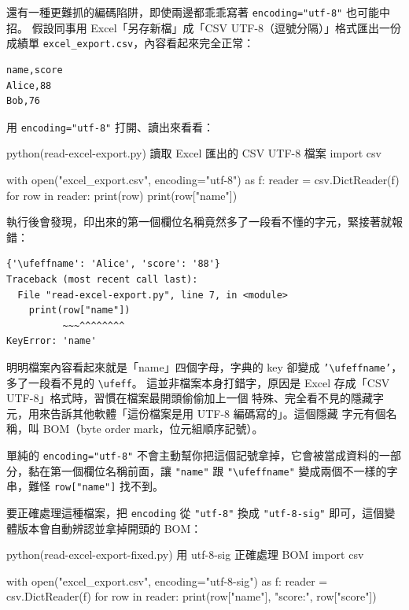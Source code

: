 還有一種更難抓的編碼陷阱，即使兩邊都乖乖寫著 \texttt{encoding="utf-8"} 也可能中招。
假設同事用 Excel「另存新檔」成「CSV UTF-8（逗號分隔）」格式匯出一份成績單
\texttt{excel\_export.csv}，內容看起來完全正常：

\begin{verbatim}
name,score
Alice,88
Bob,76
\end{verbatim}

用 \texttt{encoding="utf-8"} 打開、讀出來看看：

\begin{example}{python}{(read-excel-export.py) 讀取 Excel 匯出的 CSV UTF-8 檔案}
import csv

with open("excel_export.csv", encoding="utf-8") as f:
    reader = csv.DictReader(f)
    for row in reader:
        print(row)
        print(row["name"])
\end{example}

執行後會發現，印出來的第一個欄位名稱竟然多了一段看不懂的字元，緊接著就報錯：

\begin{verbatim}
{'\ufeffname': 'Alice', 'score': '88'}
Traceback (most recent call last):
  File "read-excel-export.py", line 7, in <module>
    print(row["name"])
          ~~~^^^^^^^^
KeyError: 'name'
\end{verbatim}

明明檔案內容看起來就是「name」四個字母，字典的 key 卻變成
\texttt{'\textbackslash ufeffname'}，多了一段看不見的 \texttt{\textbackslash ufeff}。
這並非檔案本身打錯字，原因是 Excel 存成「CSV UTF-8」格式時，習慣在檔案最開頭偷偷加上一個
特殊、完全看不見的隱藏字元，用來告訴其他軟體「這份檔案是用 UTF-8 編碼寫的」。這個隱藏
字元有個名稱，叫 BOM（byte order mark，位元組順序記號）。

單純的 \texttt{encoding="utf-8"}
不會主動幫你把這個記號拿掉，它會被當成資料的一部分，黏在第一個欄位名稱前面，讓
\texttt{"name"} 跟 \texttt{"\textbackslash ufeffname"} 變成兩個不一樣的字串，難怪
\texttt{row["name"]} 找不到。

要正確處理這種檔案，把 \texttt{encoding} 從 \texttt{"utf-8"} 換成 \texttt{"utf-8-sig"}
即可，這個變體版本會自動辨認並拿掉開頭的 BOM：

\begin{example}{python}{(read-excel-export-fixed.py) 用 utf-8-sig 正確處理 BOM}
import csv

with open("excel_export.csv", encoding="utf-8-sig") as f:
    reader = csv.DictReader(f)
    for row in reader:
        print(row["name"], "score:", row["score"])
\end{example}


